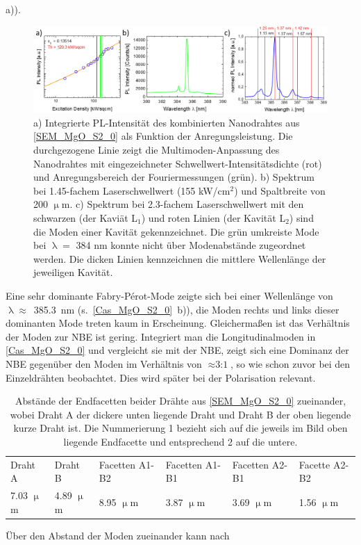 a)).\begin{figure}[t]
\includegraphics[width=1\textwidth]{Bilder/MgO/Cas_MgO_S2_0} \caption{a)
Integrierte PL-Intensität des kombinierten Nanodrahtes aus
\autoref{SEM_MgO_S2_0} als Funktion der Anregungsleistung. Die durchgezogene
Linie zeigt die Multimoden-Anpassung des Nanodrahtes mit eingezeichneter
Schwellwert-Intensitätsdichte (rot) und Anregungsbereich der Fouriermessungen
(grün). b) Spektrum bei 1.45-fachem Laserschwellwert (155 kW/cm$^\text{2}$) und
Spaltbreite von 200 $\upmu$m. c) Spektrum bei 2.3-fachem Laserschwellwert mit
den schwarzen (der Kaviät L$_\text{1}$) und roten Linien (der Kavität
L$_\text{2}$) sind die Moden einer Kavität gekennzeichnet. Die grün umkreiste
Mode bei $\uplambda=$ 384 nm konnte nicht über Modenabstände zugeordnet werden.
Die dicken Linien kennzeichnen die mittlere Wellenlänge der jeweiligen Kavität.}
\label{Cas_MgO_S2_0} \end{figure}Eine sehr dominante Fabry-Pérot-Mode zeigte
sich bei einer Wellenlänge von \mbox{$\uplambda \approx$ 385.3 nm} \mbox{(s.
\autoref{Cas_MgO_S2_0} b))}, die Moden rechts und links dieser dominanten Mode
treten kaum in Erscheinung. Gleichermaßen ist das Verhältnis der Moden zur NBE
ist gering. Integriert man die Longitudinalmoden in \autoref{Cas_MgO_S2_0} und
vergleicht sie mit der NBE, zeigt sich eine Dominanz der NBE gegenüber den Moden
im Verhältnis von $\approx \text{3:1}$, so wie schon zuvor bei den Einzeldrähten
beobachtet. Dies wird später bei der Polarisation relevant. \\ \begin{table}[h]
\begin{tabular}{llllll} Draht A & Draht B & Facetten A1-B2  & Facetten A1-B1 &
Facetten A2-B1 & Facette A2-B2 \\ 7.03 $\upmu$m & 4.89 $\upmu$m & 8.95 $\upmu$m
& 3.87 $\upmu$m & 3.69 $\upmu$m & 1.56 $\upmu$m \\ \end{tabular}
\caption{Abstände der Endfacetten beider Drähte aus \autoref{SEM_MgO_S2_0}
zueinander, wobei Draht A der dickere unten liegende Draht und Draht B der oben
liegende kurze Draht ist. Die Nummerierung 1 bezieht sich auf die jeweils im
Bild oben liegende Endfacette und entsprechend 2 auf die untere.}
\label{YoungDist} \end{table}Über den Abstand der Moden zueinander kann nach
